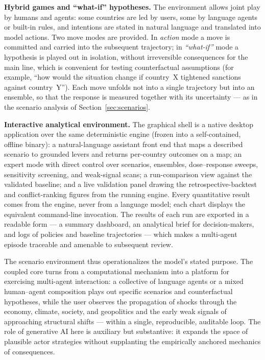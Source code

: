\documentclass[a4paper,fleqn]{cas-sc}
\begin{document}
\textbf{Hybrid games and ``what-if'' hypotheses.} The environment allows joint play by humans and
agents: some countries are led by users, some by language agents or built-in rules, and intentions
are stated in natural language and translated into model actions. Two move modes are provided. In
\emph{action} mode a move is committed and carried into the subsequent trajectory; in
\emph{``what-if''} mode a hypothesis is played out in isolation, without irreversible consequences
for the main line, which is convenient for testing counterfactual assumptions (for example, ``how
would the situation change if country~X tightened sanctions against country~Y''). Each move unfolds
not into a single trajectory but into an ensemble, so that the response is measured together with
its uncertainty --- as in the scenario analysis of Section~\ref{sec:scenarios}.

\textbf{Interactive analytical environment.} The graphical shell is a native desktop application
over the same deterministic engine (frozen into a self-contained, offline binary): a
natural-language assistant front end that maps a described scenario to grounded levers and returns
per-country outcomes on a map; an expert mode with direct control over scenarios, ensembles,
dose--response sweeps, sensitivity screening, and weak-signal scans; a run-comparison view against
the validated baseline; and a live validation panel drawing the retrospective-backtest and
conflict-ranking figures from the running engine. Every quantitative result comes from the engine,
never from a language model; each chart displays the equivalent command-line invocation. The
results of each run are exported in a readable form --- a summary dashboard, an analytical brief
for decision-makers, and logs of policies and baseline trajectories --- which makes a multi-agent
episode traceable and amenable to subsequent review.

The scenario environment thus operationalizes the model's stated purpose. The coupled core turns
from a computational mechanism into a platform for exercising multi-agent interaction: a collective
of language agents or a mixed human--agent composition plays out specific scenarios and
counterfactual hypotheses, while the user observes the propagation of shocks through the economy,
climate, society, and geopolitics and the early weak signals of approaching structural shifts ---
within a single, reproducible, auditable loop. The role of generative AI here is auxiliary but
substantive: it expands the space of plausible actor strategies without supplanting the empirically
anchored mechanics of consequences.
\end{document}
